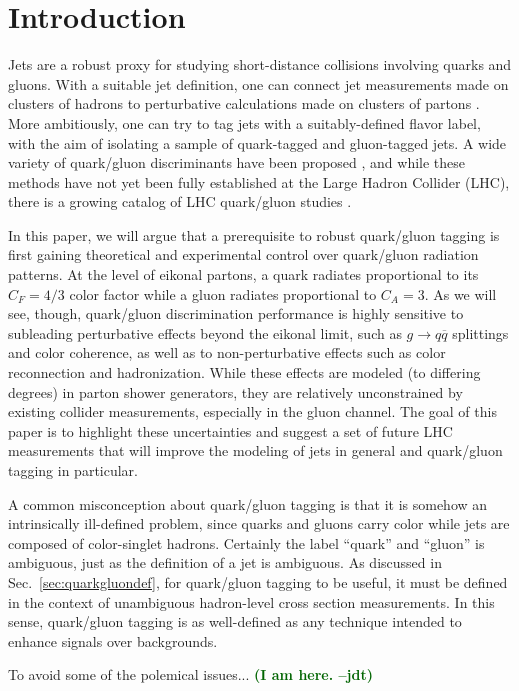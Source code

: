 \documentclass[11pt,letterpaper]{article}
\DeclareRobustCommand{\Sec}[1]{Sec.~\ref{#1}}
\newcommand{\jdt}[1]{\textbf{\textcolor{darkgreen}{(#1 --jdt)}}}
\begin{document}
\section{Introduction}
\label{introduction}

Jets are a robust proxy for studying short-distance collisions involving quarks and gluons.  With a suitable jet definition, one can connect jet measurements made on clusters of hadrons to perturbative calculations made on clusters of partons \cite{}.  More ambitiously, one can try to tag jets with a suitably-defined flavor label, with the aim of isolating a sample of quark-tagged and gluon-tagged jets.  A wide variety of quark/gluon discriminants have been proposed \cite{}, and while these methods have not yet been fully established at the Large Hadron Collider (LHC), there is a growing catalog of LHC quark/gluon studies \cite{}.

In this paper, we will argue that a prerequisite to robust quark/gluon tagging is first gaining theoretical and experimental control over quark/gluon radiation patterns.  At the level of eikonal partons, a quark radiates proportional to its $C_F = 4/3$ color factor while a gluon radiates proportional to $C_A = 3$.  As we will see, though, quark/gluon discrimination performance is highly sensitive to subleading perturbative effects beyond the eikonal limit, such as $g \to q \overline{q}$ splittings and color coherence, as well as to non-perturbative effects such as color reconnection and hadronization.   While these effects are modeled (to differing degrees) in parton shower generators, they are relatively unconstrained by existing collider measurements, especially in the gluon channel.  The goal of this paper is to highlight these uncertainties and suggest a set of future LHC measurements that will improve the modeling of jets in general and quark/gluon tagging in particular.

A common misconception about quark/gluon tagging is that it is somehow an intrinsically ill-defined problem, since quarks and gluons carry color while jets are composed of color-singlet hadrons.  Certainly the label ``quark'' and ``gluon'' is ambiguous, just as the definition of a jet is ambiguous.  As discussed in \Sec{sec:quarkgluondef}, for quark/gluon tagging to be useful, it must be defined in the context of unambiguous hadron-level cross section measurements.  In this sense, quark/gluon tagging is as well-defined as any technique intended to enhance signals over backgrounds.

To avoid some of the polemical issues... \jdt{I am here.}
\end{document}
